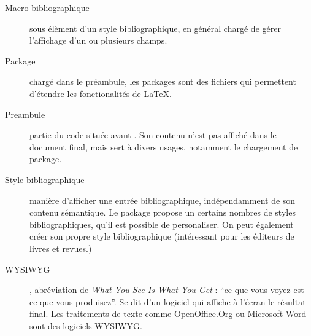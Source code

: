 \begin{description}
\item[Macro bibliographique]sous élèment d'un style bibliographique, en général chargé de gérer l'affichage d'un ou plusieurs champs.

\item[Package]chargé dans le préambule, les packages sont des fichiers qui permettent d'étendre les fonctionalités  de \LaTeX.

\item[Preambule]partie du code  située avant . Son contenu n'est pas affiché dans le document final, mais sert à divers usages, notamment le chargement de package.

\item[Style bibliographique]manière d'afficher une entrée bibliographique, indépendamment de son contenu sémantique. Le package  propose un certains nombres de styles bibliographiques, qu'il est possible de personaliser. On peut également créer son propre style bibliographique (intéressant pour les éditeurs de livres et revues.)

\item[WYSIWYG], abréviation de \textenglish{\emph{What You See Is What You Get}} : \enquote{ce que vous voyez est ce que vous produisez}. Se dit d'un logiciel qui affiche à l'écran le résultat final. Les traitements de texte comme OpenOffice.Org ou Microsoft Word sont des logiciels WYSIWYG.
\end{description}
